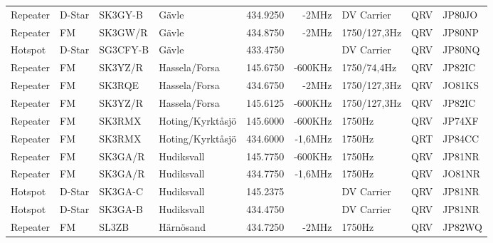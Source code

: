 \begin{landscape}
\begin{longtable}{llllrrlcl}
	Repeater          & D-Star       & SK3GY-B       & Gävle            &          434.9250 &          -2MHz & DV Carrier      &       QRV       & JP80JO           \\
	Repeater          & FM           & SK3GW/R       & Gävle            &          434.8750 &          -2MHz & 1750/127,3Hz    &       QRV       & JP80NP           \\
	Hotspot           & D-Star       & SG3CFY-B      & Gävle            &          433.4750 &                & DV Carrier      &       QRV       & JP80NQ           \\
	Repeater          & FM           & SK3YZ/R       & Hassela/Forsa    &          145.6750 &        -600KHz & 1750/74,4Hz     &       QRV       & JP82IC           \\
	Repeater          & FM           & SK3RQE        & Hassela/Forsa    &          434.6750 &          -2MHz & 1750/127,3Hz    &       QRV       & JO81KS           \\
	Repeater          & FM           & SK3YZ/R       & Hassela/Forsa    &          145.6125 &        -600KHz & 1750/127,3Hz    &       QRV       & JP82IC           \\
	Repeater          & FM           & SK3RMX        & Hoting/Kyrktåsjö &          145.6000 &        -600KHz & 1750Hz          &       QRV       & JP74XF           \\
	Repeater          & FM           & SK3RMX        & Hoting/Kyrktåsjö &          434.6000 &        -1,6MHz & 1750Hz          &       QRT       & JP84CC           \\
	Repeater          & FM           & SK3GA/R       & Hudiksvall       &          145.7750 &        -600KHz & 1750Hz          &       QRV       & JP81NR           \\
	Repeater          & FM           & SK3GA/R       & Hudiksvall       &          434.7750 &        -1,6MHz & 1750Hz          &       QRV       & JO81NR           \\
	Hotspot           & D-Star       & SK3GA-C       & Hudiksvall       &          145.2375 &                & DV Carrier      &       QRV       & JP81NR           \\
	Hotspot           & D-Star       & SK3GA-B       & Hudiksvall       &          434.4750 &                & DV Carrier      &       QRV       & JP81NR           \\
	Repeater          & FM           & SL3ZB         & Härnösand        &          434.7250 &          -2MHz & 1750Hz          &       QRV       & JP82WQ           \\

\end{longtable}
\end{landscape}
